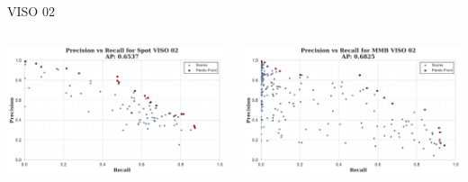 \begin{frame}{VISO 02}
    \begin{columns}
        \begin{column}{0.5\textwidth}
            \centering
            \includegraphics[width=\textwidth,keepaspectratio]{images/bom/precision_recall_Spot_VISO_02.png}
        \end{column}
        \begin{column}{0.5\textwidth}
            \centering
            \includegraphics[width=\textwidth,keepaspectratio]{images/bom/precision_recall_MMB_VISO_02.png}
        \end{column}
    \end{columns}
\end{frame}

